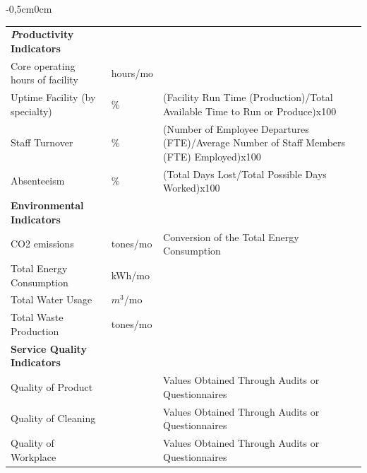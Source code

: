 \begin{table}[h!]
\begin{adjustwidth}{-0,5cm}{0cm}
{\begin{tabular}{llp{8cm}l}
		{\bf {\emph Productivity Indicators}} & & \\
		Core operating hours of facility 		& hours/mo & \\
		Uptime Facility (by specialty)					& \% & (Facility Run Time (Production)/Total Available Time to Run or Produce)x100 \\
		Staff Turnover 	 			& \% & (Number of Employee Departures (FTE)/Average Number of Staff Members (FTE) Employed)x100\\
		Absenteeism  				& \% & (Total Days Lost/Total Possible Days Worked)x100 \\
		\hline
		{\bf Environmental Indicators} & & \\
		CO2 emissions 						& tones/mo & Conversion of the Total Energy Consumption \\
		Total Energy Consumption	 		& kWh/mo & \\
		Total Water Usage					& $m^3$/mo & \\
		Total Waste Production 				& tones/mo & \\
		\hline
		{\bf Service Quality Indicators} & & \\ 
		Quality of Product 							&  &  Values Obtained Through Audits or Questionnaires \\
		Quality of Cleaning							&  & Values Obtained Through Audits or Questionnaires \\
		Quality of Workplace 						&  & Values Obtained Through Audits or Questionnaires \\

\end{tabular}}
\end{adjustwidth}
\end{table}
